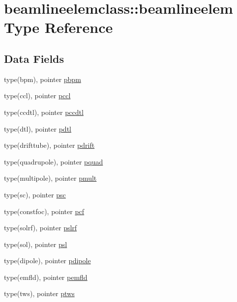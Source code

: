\hypertarget{structbeamlineelemclass_1_1beamlineelem}{}\section{beamlineelemclass\+::beamlineelem Type Reference}
\label{structbeamlineelemclass_1_1beamlineelem}
\subsection*{Data Fields}
\begin{DoxyCompactItemize}
\item 
type(bpm), pointer \mbox{\hyperlink{structbeamlineelemclass_1_1beamlineelem_ab1486848bf9231eeed15a83170442e32}{pbpm}}
\item 
type(ccl), pointer \mbox{\hyperlink{structbeamlineelemclass_1_1beamlineelem_ac12416dfd09e0a7195c5297b12c1194f}{pccl}}
\item 
type(ccdtl), pointer \mbox{\hyperlink{structbeamlineelemclass_1_1beamlineelem_afc03034604a05eb1bc374945e4ab176d}{pccdtl}}
\item 
type(dtl), pointer \mbox{\hyperlink{structbeamlineelemclass_1_1beamlineelem_a8efdbd654fcb17a5dcf4826638e79720}{pdtl}}
\item 
type(drifttube), pointer \mbox{\hyperlink{structbeamlineelemclass_1_1beamlineelem_a295bb7932c8566c26f980d0bd89d2f7d}{pdrift}}
\item 
type(quadrupole), pointer \mbox{\hyperlink{structbeamlineelemclass_1_1beamlineelem_a4dc5bf2560031246e9c34bc11576b75c}{pquad}}
\item 
type(multipole), pointer \mbox{\hyperlink{structbeamlineelemclass_1_1beamlineelem_aa189f35902f7b7265e0485c363023f28}{pmult}}
\item 
type(sc), pointer \mbox{\hyperlink{structbeamlineelemclass_1_1beamlineelem_ad948a3ca9b39d5bc89fabe69a16b26f2}{psc}}
\item 
type(constfoc), pointer \mbox{\hyperlink{structbeamlineelemclass_1_1beamlineelem_a39cb4d5220b28f075e92fd09819f86ce}{pcf}}
\item 
type(solrf), pointer \mbox{\hyperlink{structbeamlineelemclass_1_1beamlineelem_ae4662d217dff6d83c07fe77d93525c61}{pslrf}}
\item 
type(sol), pointer \mbox{\hyperlink{structbeamlineelemclass_1_1beamlineelem_a227ca9307b3706cafe607d50bc6efaec}{psl}}
\item 
type(dipole), pointer \mbox{\hyperlink{structbeamlineelemclass_1_1beamlineelem_a2427f96729e2667041326c4dcf583b82}{pdipole}}
\item 
type(emfld), pointer \mbox{\hyperlink{structbeamlineelemclass_1_1beamlineelem_a626e5426ee98993dfe2352be10075411}{pemfld}}
\item 
type(tws), pointer \mbox{\hyperlink{structbeamlineelemclass_1_1beamlineelem_aaf07ee15460778392212e2c7232079a7}{ptws}}
\end{DoxyCompactItemize}



